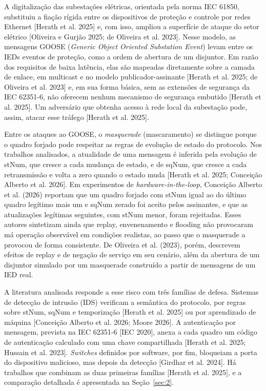 \documentclass[12pt]{article}
\newcommand{\cit}[2]{[#1]\nocite{#2}}
\newcommand{\citn}[2]{#1\nocite{#2}}
\begin{document}
A digitalização das subestações elétricas, orientada pela norma IEC 61850, substituiu a fiação rígida entre os dispositivos de proteção e controle por redes Ethernet \cit{Herath et al. 2025}{herath2025evaluation} e, com isso, ampliou a superfície de ataque do setor elétrico \cit{Oliveira e Gurjão 2025; de Oliveira et al. 2023}{oliveira2025analisador,oliveira2023ataques}. Nesse modelo, as mensagens GOOSE (\emph{Generic Object Oriented Substation Event}) levam entre os IEDs eventos de proteção, como a ordem de abertura de um disjuntor. Em razão dos requisitos de baixa latência, elas são mapeadas diretamente sobre a camada de enlace, em multicast e no modelo publicador-assinante \cit{Herath et al. 2025; de Oliveira et al. 2023}{herath2025evaluation,oliveira2023ataques} e, em sua forma básica, sem as extensões de segurança da IEC 62351-6, não oferecem nenhum mecanismo de segurança embutido \cit{Herath et al. 2025}{herath2025evaluation}. Um adversário que obtenha acesso à rede local da subestação pode, assim, atacar esse tráfego \cit{Herath et al. 2025}{herath2025evaluation}.

Entre os ataques ao GOOSE, o \emph{masquerade} (mascaramento) se distingue porque o quadro forjado pode respeitar as regras de evolução de estado do protocolo. Nos trabalhos analisados, a atualidade de uma mensagem é inferida pela evolução de stNum, que cresce a cada mudança de estado, e de sqNum, que cresce a cada retransmissão e volta a zero quando o estado muda \cit{Herath et al. 2025; Conceição Alberto et al. 2026}{herath2025evaluation,alberto2026gooseidrs}. Em experimentos de \emph{hardware-in-the-loop}, \citn{Conceição Alberto et al. (2026)}{alberto2026gooseidrs} reportam que um quadro forjado com stNum igual ao do último quadro legítimo mais um e sqNum zerado foi aceito pelos assinantes, e que as atualizações legítimas seguintes, com stNum menor, foram rejeitadas. Esses autores sintetizam ainda que replay, envenenamento e flooding não provocaram má operação observável em condições realistas, ao passo que o masquerade a provocou de forma consistente. De Oliveira et al. (2023), porém, descrevem efeitos de replay e de negação de serviço em seu cenário, além da abertura de um disjuntor simulado por um masquerade construído a partir de mensagens de um IED real.

A literatura analisada responde a esse risco com três famílias de defesa. Sistemas de detecção de intrusão (IDS) verificam a semântica do protocolo, por regras sobre stNum, sqNum e temporização \cit{Herath et al. 2025}{herath2025evaluation} ou por aprendizado de máquina \cit{Conceição Alberto et al. 2026; Moore 2026}{alberto2026gooseidrs,moore2026anomaly}. A autenticação por mensagem, prevista na IEC 62351-6 \cit{IEC 2020}{iec62351-6}, anexa a cada quadro um código de autenticação calculado com uma chave compartilhada \cit{Herath et al. 2025; Hussain et al. 2023}{herath2025evaluation,hussain2023hybrid}. \emph{Switches} definidos por software, por fim, bloqueiam a porta do dispositivo malicioso, mas depois da detecção \cit{Girdhar et al. 2024}{girdhar2024sdn}. Há trabalhos que combinam as duas primeiras famílias \cit{Herath et al. 2025}{herath2025evaluation}, e a comparação detalhada é apresentada na Seção~\ref{sec:2}.
\end{document}
